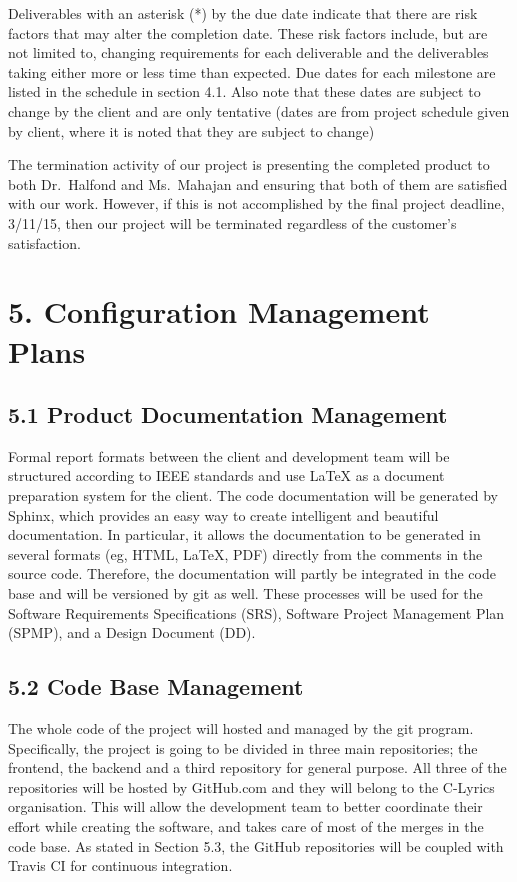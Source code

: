\documentclass[]{article}
\begin{document}
Deliverables with an asterisk (*) by the due date indicate that there
are risk factors that may alter the completion date. These risk factors
include, but are not limited to, changing requirements for each
deliverable and the deliverables taking either more or less time than
expected. Due dates for each milestone are listed in the schedule in
section 4.1. Also note that these dates are subject to change by the
client and are only tentative (dates are from project schedule given by
client, where it is noted that they are subject to change)

The termination activity of our project is presenting the completed
product to both Dr.~Halfond and Ms.~Mahajan and ensuring that both of
them are satisfied with our work. However, if this is not accomplished
by the final project deadline, 3/11/15, then our project will be
terminated regardless of the customer's satisfaction.

\section{5. Configuration Management
Plans}\label{configuration-management-plans}

\subsection{5.1 Product Documentation
Management}\label{product-documentation-management}

Formal report formats between the client and development team will be
structured according to IEEE standards and use LaTeX as a document
preparation system for the client. The code documentation will be
generated by Sphinx, which provides an easy way to create intelligent
and beautiful documentation. In particular, it allows the documentation
to be generated in several formats (eg, HTML, LaTeX, PDF) directly from
the comments in the source code. Therefore, the documentation will
partly be integrated in the code base and will be versioned by git as
well. These processes will be used for the Software Requirements
Specifications (SRS), Software Project Management Plan (SPMP), and a
Design Document (DD).

\subsection{5.2 Code Base Management}\label{code-base-management}

The whole code of the project will hosted and managed by the git
program. Specifically, the project is going to be divided in three main
repositories; the frontend, the backend and a third repository for
general purpose. All three of the repositories will be hosted by
GitHub.com and they will belong to the C-Lyrics organisation. This will
allow the development team to better coordinate their effort while
creating the software, and takes care of most of the merges in the code
base. As stated in Section 5.3, the GitHub repositories will be coupled
with Travis CI for continuous integration.
\end{document}

